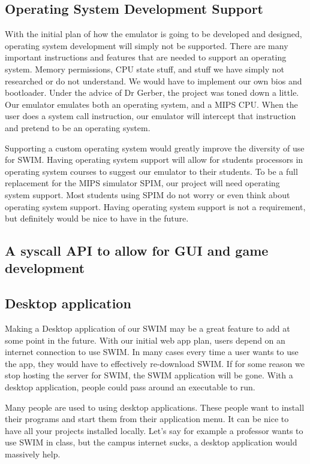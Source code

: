 \documentclass[parskip=half, fontsize=12pt]{scrartcl}
\begin{document}
\subsection{Operating System Development Support}

With the initial plan of how the emulator is going to be developed and
designed, operating system development will simply not be supported.
There are many important instructions and features that are needed to
support an operating system. Memory permissions, CPU state stuff, and
stuff we have simply not researched or do not understand. We would have
to implement our own bios and bootloader. Under the advice of Dr Gerber,
the project was toned down a little. Our emulator emulates both an
operating system, and a MIPS CPU. When the user does a system call
instruction, our emulator will intercept that instruction and pretend to
be an operating system.

Supporting a custom operating system would greatly improve the diversity
of use for SWIM. Having operating system support will allow for students
processors in operating system courses to suggest our emulator to their
students. To be a full replacement for the MIPS simulator SPIM, our
project will need operating system support. Most students using SPIM do
not worry or even think about operating system support. Having operating
system support is not a requirement, but definitely would be nice to
have in the future.

\subsection{A syscall API to allow for GUI and game development}

\subsection{Desktop application}

Making a Desktop application of our SWIM may be a great feature to add
at some point in the future. With our initial web app plan, users depend
on an internet connection to use SWIM. In many cases every time a user
wants to use the app, they would have to effectively re-download SWIM.
If for some reason we stop hosting the server for SWIM, the SWIM
application will be gone. With a desktop application, people could pass
around an executable to run.

Many people are used to using desktop applications. These people want to
install their programs and start them from their application menu. It
can be nice to have all your projects installed locally. Let's say for
example a professor wants to use SWIM in class, but the campus internet
sucks, a desktop application would massively help.
\end{document}
